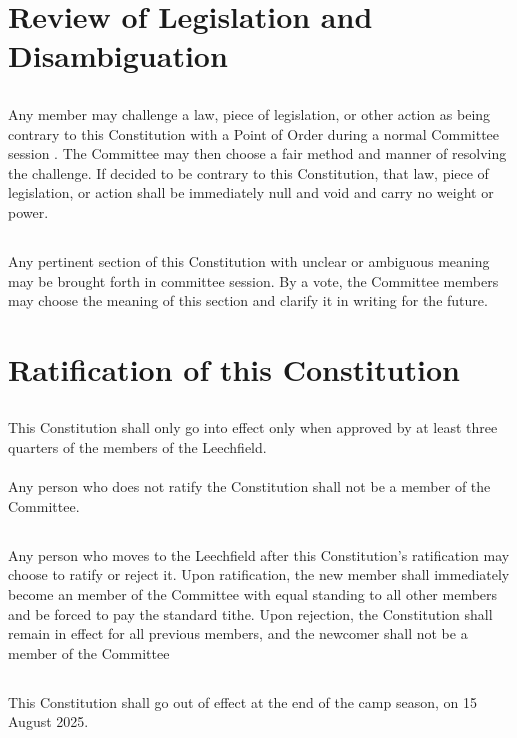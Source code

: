 \documentclass[6pt]{bill}
\begin{document}
	\section{Review of Legislation and Disambiguation}{
		\subsection{}{
			Any member may challenge a law, piece of legislation, or other action as being contrary to this Constitution with a Point of Order during a normal Committee session . The Committee may then choose a fair method and manner of resolving the challenge. If decided to be contrary to this Constitution, that law, piece of legislation, or action shall be immediately null and void and carry no weight or power.
		}
		\subsection{}{
			Any pertinent section of this Constitution with unclear or ambiguous meaning may be brought forth in committee session. By a vote, the Committee members may choose the meaning of this section and clarify it in writing for the future.
		}
	}

	\section{Ratification of this Constitution}{
		\subsection{}{
			This Constitution shall only go into effect only when approved by at least three quarters of the members of the Leechfield.
			\paragraph{}{
				Any person who does not ratify the Constitution shall not be a member of the Committee.
			}
		}
		\subsection{}{
			Any person who moves to the Leechfield after this Constitution's ratification may choose to ratify or reject it. Upon ratification, the new member shall immediately become an member of the Committee with equal standing to all other members and be forced to pay the standard tithe. Upon rejection, the Constitution shall remain in effect for all previous members, and the newcomer shall not be a member of the Committee
		}
		\subsection{}{
			This Constitution shall go out of effect at the end of the camp season, on 15 August 2025.
		}
	}
	
\end{document}
